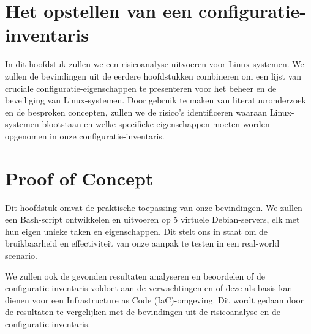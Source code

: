 \section{Het opstellen van een configuratie-inventaris}
\label{sec:risicoanalyse}
In dit hoofdstuk zullen we een risicoanalyse uitvoeren voor Linux-systemen.
We zullen de bevindingen uit de eerdere hoofdstukken combineren om een lijst van cruciale configuratie-eigenschappen te presenteren voor het beheer en de beveiliging van Linux-systemen.
Door gebruik te maken van literatuuronderzoek en de besproken concepten, zullen we de risico's identificeren waaraan Linux-systemen blootstaan en welke specifieke eigenschappen moeten worden opgenomen in onze configuratie-inventaris.

\section{Proof of Concept}
\label{sec:proof-of-concept}
Dit hoofdstuk omvat de praktische toepassing van onze bevindingen.
We zullen een Bash-script ontwikkelen en uitvoeren op 5 virtuele Debian-servers, elk met hun eigen unieke taken en eigenschappen.
Dit stelt ons in staat om de bruikbaarheid en effectiviteit van onze aanpak te testen in een real-world scenario.

We zullen ook de gevonden resultaten analyseren en beoordelen of de configuratie-inventaris voldoet aan de verwachtingen en of deze als basis kan dienen voor een Infrastructure as Code (IaC)-omgeving.
Dit wordt gedaan door de resultaten te vergelijken met de bevindingen uit de risicoanalyse en de configuratie-inventaris.

